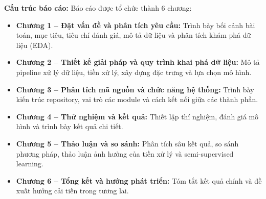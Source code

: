 \textbf{Cấu trúc báo cáo:} Báo cáo được tổ chức thành 6 chương:

\begin{itemize}
    \item \textbf{Chương 1 -- Đặt vấn đề và phân tích yêu cầu:} Trình bày bối cảnh bài toán, mục tiêu, tiêu chí đánh giá, mô tả dữ liệu và phân tích khám phá dữ liệu (EDA).
    \item \textbf{Chương 2 -- Thiết kế giải pháp và quy trình khai phá dữ liệu:} Mô tả pipeline xử lý dữ liệu, tiền xử lý, xây dựng đặc trưng và lựa chọn mô hình.
    \item \textbf{Chương 3 -- Phân tích mã nguồn và chức năng hệ thống:} Trình bày kiến trúc repository, vai trò các module và cách kết nối giữa các thành phần.
    \item \textbf{Chương 4 -- Thử nghiệm và kết quả:} Thiết lập thí nghiệm, đánh giá mô hình và trình bày kết quả chi tiết.
    \item \textbf{Chương 5 -- Thảo luận và so sánh:} Phân tích sâu kết quả, so sánh phương pháp, thảo luận ảnh hưởng của tiền xử lý và semi-supervised learning.
    \item \textbf{Chương 6 -- Tổng kết và hướng phát triển:} Tóm tắt kết quả chính và đề xuất hướng cải tiến trong tương lai.
\end{itemize}
